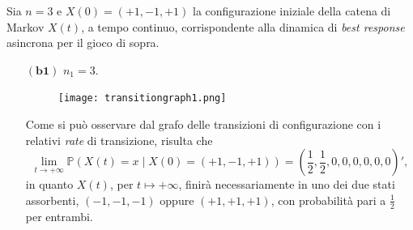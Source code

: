 \documentclass[11pt,largemargins]{homework}
\begin{document}
\begin{alphaparts}
  
  
  \newpage
  \questionpart
  Sia $n=3$ e $X\left(0\right)=\left(+1,-1,+1\right)$ la configurazione iniziale della catena di Markov $X\left(t\right)$, a tempo continuo, corrispondente alla dinamica di \emph{best response} asincrona per il gioco di sopra. \\
  \begin{itemize}
  
 \item[$\left(\textbf{b1}\right)$] $n_{1}=3$. 
 \begin{figure}[htb]\centering
\texttt{[image: transitiongraph1.png]}
  \end{figure}
  
  Come si può osservare dal grafo delle transizioni di configurazione con i relativi \emph{rate} di transizione, risulta che
  \begin{equation*}
  \lim\limits_{t \rightarrow +\infty}\mathbb{P}\left(X\left(t\right)=x\mid X\left(0\right)=\left(+1,-1,+1\right)\right)=\left(\frac{1}{2},\frac{1}{2},0,0,0,0,0,0\right)',
\end{equation*}
in quanto $X\left(t\right)$, per $t\mapsto +\infty$, finirà necessariamente in uno dei due stati assorbenti, $\left(-1,-1,-1\right)$ oppure $\left(+1,+1,+1\right)$, con probabilità pari a $\frac{1}{2}$ per entrambi.


\end{itemize}
\end{alphaparts}
\end{document}
